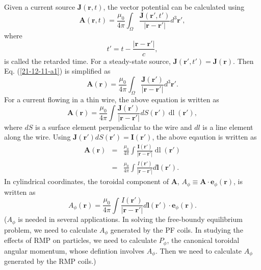 \documentclass{llncs}
\newcommand{\tmop}[1]{\ensuremath{\operatorname{#1}}}
\begin{document}
Given a current source $\mathbf{J} (\mathbf{r}, t)$, the vector potential can
be calculated using
\begin{equation}
  \label{21-12-11-a1} \mathbf{A} (\mathbf{r}, t) = \frac{\mu_0}{4 \pi}
  \int_{\Omega} \frac{\mathbf{J} (\mathbf{r}', t')}{| \mathbf{r}-\mathbf{r}'
  |} d^3 \mathbf{r}',
\end{equation}
where
\begin{equation}
  t' = t - \frac{| \mathbf{r}-\mathbf{r}' |}{c},
\end{equation}
is called the retarded time. For a steady-state source, $\mathbf{J}
(\mathbf{r}', t') =\mathbf{J} (\mathbf{r})$. Then Eq. (\ref{21-12-11-a1}) is
simplified as
\begin{equation}
  \mathbf{A} (\mathbf{r}) = \frac{\mu_0}{4 \pi} \int_{\Omega} \frac{\mathbf{J}
  (\mathbf{r}')}{| \mathbf{r}-\mathbf{r}' |} d^3 \mathbf{r}' .
\end{equation}
For a current flowing in a thin wire, the above equation is written as
\begin{equation}
  \mathbf{A} (\mathbf{r}) = \frac{\mu_0}{4 \pi} \int \frac{\mathbf{J}
  (\mathbf{r}')}{| \mathbf{r}-\mathbf{r}' |} d S (\mathbf{r}') \tmop{dl}
  (\mathbf{r}'),
\end{equation}
where $d S$ is a surface element perpendicular to the wire and $d l$ is a line
element along the wire. Using $\mathbf{J} (\mathbf{r}') d S (\mathbf{r}')
=\mathbf{I} (\mathbf{r}')$, the above eqaution is written as
\begin{eqnarray}
  \mathbf{A} (\mathbf{r}) & = & \frac{\mu_0}{4 \pi} \int \frac{\mathbf{I}
  (\mathbf{r}')}{| \mathbf{r}-\mathbf{r}' |} \tmop{dl} (\mathbf{r}')
  \nonumber\\
  & = & \frac{\mu_0}{4 \pi} \int \frac{I (\mathbf{r}')}{|
  \mathbf{r}-\mathbf{r}' |} d\mathbf{l} (\mathbf{r}') . 
\end{eqnarray}
In cylindrical coordinates, the toroidal component of $\mathbf{A}$, $A_{\phi}
\equiv \mathbf{A} \cdot \mathbf{e}_{\phi} (\mathbf{r})$, is written as
\begin{equation}
  A_{\phi} (\mathbf{r}) = \frac{\mu_0}{4 \pi} \int \frac{I (\mathbf{r}')}{|
  \mathbf{r}-\mathbf{r}' |} d\mathbf{l} (\mathbf{r}') \cdot \mathbf{e}_{\phi}
  (\mathbf{r}) .
\end{equation}
($A_{\phi}$ is needed in several applications. In solving the free-boundy
equilibrium problem, we need to calculate $A_{\phi}$ generated by the PF
coils. In studying the effects of RMP on particles, we need to calculate
$P_{\phi}$, the canonical toroidal angular momentum, whose defintion involves
$A_{\phi}$. Then we need to calculate $A_{\phi}$ generated by the RMP coils.)
\end{document}
